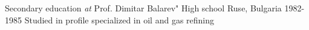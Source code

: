 \vspace{+3mm}
\cventry
{Secondary education \textit{at} Prof. Dimitar Balarev" High school}
{Ruse, Bulgaria 1982-1985}
{
Studied in profile specialized in oil and gas refining
}
\vspace{+3mm}